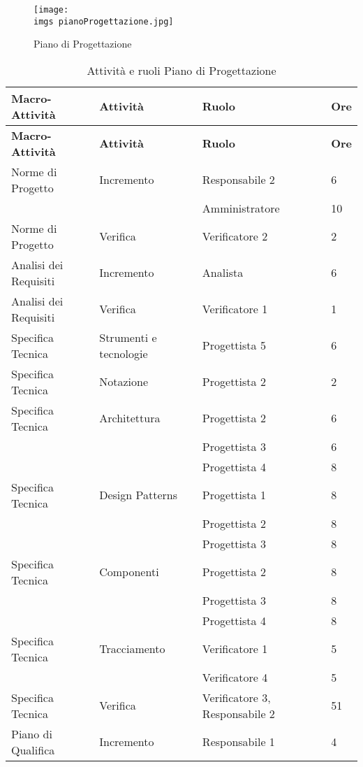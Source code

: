{{	\begin{figure}[H]
		\texttt{[image: \\imgs pianoProgettazione.jpg]}
		\label{fig:pianoprogettazione}
		\caption{Piano di Progettazione}
	\end{figure}
	
	\begin{longtable} [c]{| l | l | l | l |}
		\caption{Attivit\`{a} e ruoli Piano di Progettazione \label{tab:pianoprogettazione}}\\
		 \hline
		 \textbf{Macro-Attivit\`{a}} & \textbf{Attivit\`{a}} & \textbf{Ruolo} & \textbf{Ore}\\
		 \hline
		 \endfirsthead
		 \hline
		 \textbf{Macro-Attivit\`{a}} & \textbf{Attivit\`{a}} & \textbf{Ruolo} & \textbf{Ore}\\
		 \hline
			\endhead
		 \hline
		 \endfoot
		 \hline
		 \endlastfoot
		 Norme di Progetto & Incremento & Responsabile 2 & 6\\
		 &	&	Amministratore & 10\\
		 Norme di Progetto & Verifica & Verificatore 2 & 2 \\
		 Analisi dei Requisiti & Incremento & Analista & 6 \\
		 Analisi dei Requisiti & Verifica & Verificatore 1 & 1 \\
		 Specifica Tecnica & Strumenti e tecnologie & Progettista 5 & 6 \\
		 Specifica Tecnica & Notazione & Progettista 2 & 2 \\
		 Specifica Tecnica & Architettura & Progettista 2 & 6\\
		 &	&	Progettista 3 & 6\\
		 &	&	Progettista 4 & 8\\
		 Specifica Tecnica & Design Patterns & Progettista 1 & 8\\
		 &	&	Progettista 2 & 8\\
		 &	&	Progettista 3 & 8\\
		 Specifica Tecnica & Componenti & Progettista 2 & 8\\
		 &	&	Progettista 3 & 8\\
		 &	&	Progettista 4 & 8\\
		 Specifica Tecnica & Tracciamento & Verificatore 1 & 5\\
		 &	&	Verificatore 4 & 5\\
		Specifica Tecnica & Verifica & Verificatore 3, Responsabile 2 & 51 \\
		Piano di Qualifica & Incremento & Responsabile 1 & 4 \\

\end{longtable}}}

